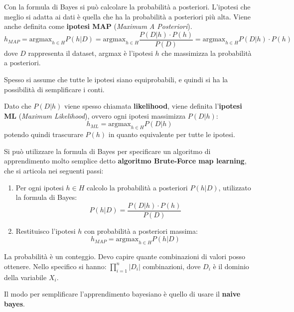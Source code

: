Con la formula di Bayes si può calcolare la probabilità a posteriori. L'ipotesi
che meglio si adatta ai dati è quella che ha la probabilità a posteriori più alta.
Viene anche definita come \textbf{ipotesi MAP} (\textit{Maximum A Posteriori}).
\begin{equation}
    h_{MAP} = \text{argmax}_{h \in H} P(h|D) = \text{argmax}_{h \in H} \frac{P(D|h) \cdot P(h)}{P(D)} = \text{argmax}_{h \in H} P(D|h) \cdot P(h)
\end{equation}
dove $D$ rappresenta il dataset, argmax è l'ipotesi $h$ che massimizza la probabilità
a posteriori.

Spesso si assume che tutte le ipotesi siano equiprobabili, e quindi si ha la
possibilità di semplificare i conti.

Dato che $P(D | h)$ viene spesso chiamata \textbf{likelihood}, viene definita
l'\textbf{ipotesi ML} (\textit{Maximum Likelihood}), ovvero ogni ipotesi massimizza $P(D|h)$:
\begin{equation}
    h_{ML} = \text{argmax}_{h \in H} P(D|h)
\end{equation}
potendo quindi trascurare $P(h)$ in quanto equivalente per tutte le ipotesi.

Si può utilizzare la formula di Bayes per specificare un algoritmo di apprendimento
molto semplice detto \textbf{algoritmo Brute-Force map learning}, che si articola
nei seguenti passi:
\begin{enumerate}
    \item Per ogni ipotesi $h \in H$ calcolo la probabilità a posteriori $P(h|D)$,
          utilizzato la formula di Bayes:
          \begin{equation}
              P(h|D) = \frac{P(D|h) \cdot P(h)}{P(D)}
          \end{equation}
    \item Restituisco l'ipotesi $h$ con probabilità a posteriori massima:
          \begin{equation}
              h_{MAP} = \text{argmax}_{h \in H} P(h|D)
          \end{equation}
\end{enumerate}
\begin{nota}
    La probabilità è un conteggio. Devo capire quante combinazioni di valori posso
    ottenere. Nello specifico si hanno: $\prod_{i=1}^n |D_i|$ combinazioni, dove
    $D_i$ è il dominio della variabile $X_i$.
\end{nota}
Il modo per semplificare l'apprendimento bayesiano è quello di usare il \textbf{naive bayes}.

